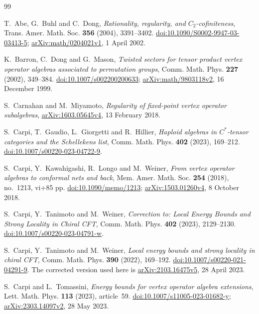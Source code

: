 \begin{thebibliography}{99}

T.~Abe, G.~Buhl and C.~Dong,
\emph{Rationality, regularity, and \(C_2\)-cofiniteness},
Trans. Amer. Math. Soc. \textbf{356} (2004), 3391--3402.
\href{https://doi.org/10.1090/S0002-9947-03-03413-5}{doi:10.1090/S0002-9947-03-03413-5};
\href{https://arxiv.org/abs/math/0204021v1}{arXiv:math/0204021v1},
1 April 2002.

K.~Barron, C.~Dong and G.~Mason,
\emph{Twisted sectors for tensor product vertex operator algebras associated to permutation groups},
Comm. Math. Phys. \textbf{227} (2002), 349--384.
\href{https://doi.org/10.1007/s002200200633}{doi:10.1007/s002200200633};
\href{https://arxiv.org/abs/math/9803118v2}{arXiv:math/9803118v2},
16 December 1999.

S.~Carnahan and M.~Miyamoto,
\emph{Regularity of fixed-point vertex operator subalgebras},
\href{https://arxiv.org/abs/1603.05645v4}{arXiv:1603.05645v4},
13 February 2018.

S.~Carpi, T.~Gaudio, L.~Giorgetti and R.~Hillier,
\emph{Haploid algebras in \(C^*\)-tensor categories and the Schellekens list},
Comm. Math. Phys. \textbf{402} (2023), 169--212.
\href{https://doi.org/10.1007/s00220-023-04722-9}{doi:10.1007/s00220-023-04722-9}.

S.~Carpi, Y.~Kawahigashi, R.~Longo and M.~Weiner,
\emph{From vertex operator algebras to conformal nets and back},
Mem. Amer. Math. Soc. \textbf{254} (2018), no.~1213, vi+85 pp.
\href{https://doi.org/10.1090/memo/1213}{doi:10.1090/memo/1213};
\href{https://arxiv.org/abs/1503.01260v4}{arXiv:1503.01260v4},
8 October 2018.

S.~Carpi, Y.~Tanimoto and M.~Weiner,
\emph{Correction to: Local Energy Bounds and Strong Locality in Chiral CFT},
Comm. Math. Phys. \textbf{402} (2023), 2129--2130.
\href{https://doi.org/10.1007/s00220-023-04791-w}{doi:10.1007/s00220-023-04791-w}.

S.~Carpi, Y.~Tanimoto and M.~Weiner,
\emph{Local energy bounds and strong locality in chiral CFT},
Comm. Math. Phys. \textbf{390} (2022), 169--192.
\href{https://doi.org/10.1007/s00220-021-04291-9}{doi:10.1007/s00220-021-04291-9}.
The corrected version used here is
\href{https://arxiv.org/abs/2103.16475v5}{arXiv:2103.16475v5},
28 April 2023.

S.~Carpi and L.~Tomassini,
\emph{Energy bounds for vertex operator algebra extensions},
Lett. Math. Phys. \textbf{113} (2023), article~59.
\href{https://doi.org/10.1007/s11005-023-01682-y}{doi:10.1007/s11005-023-01682-y};
\href{https://arxiv.org/abs/2303.14097v2}{arXiv:2303.14097v2},
28 May 2023.


\end{thebibliography}
